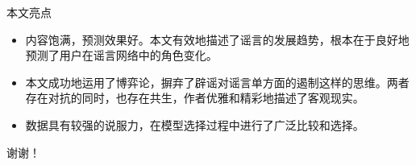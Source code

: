 \documentclass{beamer}
\begin{document}
\begin{frame}{本文亮点}
	\begin{itemize}
		\item 内容饱满，预测效果好。本文有效地描述了谣言的发展趋势，根本在于良好地预测了用户在谣言网络中的角色变化。
		\item 本文成功地运用了博弈论，摒弃了辟谣对谣言单方面的遏制这样的思维。两者存在对抗的同时，也存在共生，作者优雅和精彩地描述了客观现实。
		\item 数据具有较强的说服力，在模型选择过程中进行了广泛比较和选择。
	\end{itemize}
\end{frame}

\begin{frame}
	谢谢！
\end{frame}
\end{document}
